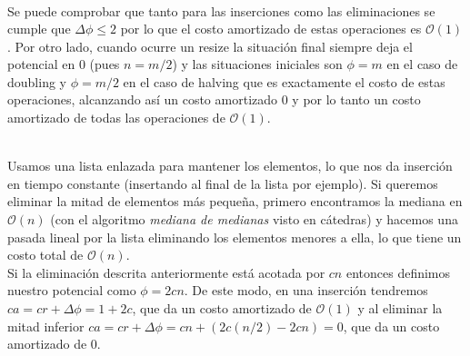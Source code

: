 \documentclass[dcc,uchile]{fcfmcourse}
\begin{document}
\begin{problems}
\begin{enumerate}[a)]
\begin{itemize}
\begin{align*}
        \end{align*}
        Se puede comprobar que tanto para las inserciones como las eliminaciones se cumple que $\Delta \phi \le 2$ por lo que el costo amortizado de estas operaciones es $\mathcal{O}(1)$. Por otro lado, cuando ocurre un resize la situación final siempre deja el potencial en $0$ (pues $n=m/2$) y las situaciones iniciales son $\phi = m$ en el caso de doubling y $\phi = m/2$ en el caso de halving que es exactamente el costo de estas operaciones, alcanzando así un costo amortizado $0$ y por lo tanto un costo amortizado de todas las operaciones de $\mathcal{O}(1)$.
    \end{itemize}
\end{enumerate}
\\
Usamos una lista enlazada para mantener los elementos, lo que nos da inserción en tiempo constante (insertando al final de la lista por ejemplo). Si queremos eliminar la mitad de elementos más pequeña, primero encontramos la mediana en $\mathcal{O}(n)$ (con el algoritmo \textit{mediana de medianas} visto en cátedras) y hacemos una pasada lineal por la lista eliminando los elementos menores a ella, lo que tiene un costo total de $\mathcal{O}(n)$.\\

Si la eliminación descrita anteriormente está acotada por $cn$ entonces definimos nuestro potencial como $\phi = 2cn$. De este modo, en una inserción tendremos $ca = cr +\Delta \phi = 1 + 2c$, que da un costo amortizado de $\mathcal{O}(1)$ y al eliminar la mitad inferior $ca = cr + \Delta \phi = cn + (2c(n/2)-2cn) = 0$, que da un costo amortizado de $0$.
\end{problems}
\end{document}
